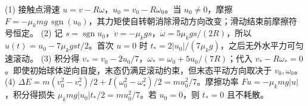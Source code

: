 (1) 接触点滑速 \(u=v-R\omega\)，\(u_0=v_0-R\omega_0\)。当 \(u_0\ne0\)，摩擦 \(F=-\mu_kmg\,\operatorname{sgn}(u_0)\)，其力矩使自转朝消除滑动方向改变；滑动结束前摩擦符号恒定。
(2) 记 \(s=\operatorname{sgn}u_0\)，\(\dot v=-\mu_kg s\)，\(\dot\omega=5\mu_kg s/(2R)\)，所以 \(u(t)=u_0-7\mu_kgst/2\)。首次 \(u=0\) 时 \(t_*=2|u_0|/(7\mu_kg)\)，之后无外水平力可匀速滚动。
(3) 积分得 \(v_*=v_0-2u_0/7\)，\(\omega_*=\omega_0+5u_0/(7R)\)；代入 \(v_*-R\omega_*=0\)。即使初始球体逆向自旋，末态仍满足滚动约束，但末态平动方向取决于 \(v_0,\omega_0\)。
(4) \(\Delta E=m(v_0^2-v_*^2)/2+I(\omega_0^2-\omega_*^2)/2=mu_0^2/7\)。摩擦功率 \(F u=-\mu_kmg|u|\)，积分得损失 \(\mu_kmg|u_0|t_*/2=mu_0^2/7\)。若 \(u_0=0\)，则 \(t_*=0\) 且不耗散。
